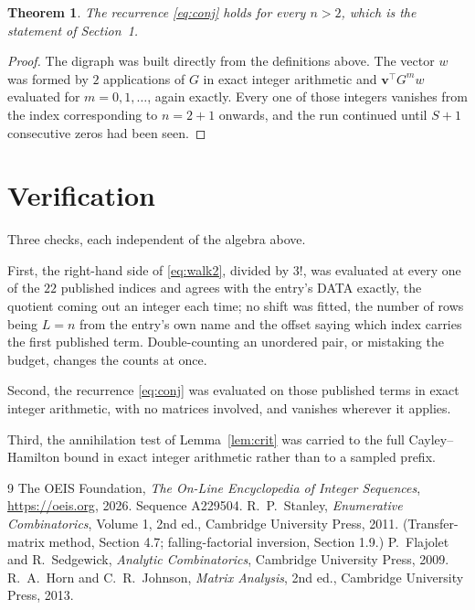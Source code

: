 \documentclass[11pt,a4paper]{article}
\theoremstyle{plain}
\newtheorem{theorem}{Theorem}
\theoremstyle{definition}
\begin{document}
\begin{theorem}
The recurrence \eqref{eq:conj} holds for every $n>2$, which is the statement of
Section~1.
\end{theorem}

\begin{proof}
The digraph was built directly from the definitions above. The vector $w$ was formed by
$2$ applications of $G$ in exact integer arithmetic and $\mathbf{v}^{\!\top}G^{m}w$
evaluated for $m=0,1,\dots$, again exactly. Every one of those integers vanishes from the
index corresponding to $n=2+1$ onwards, and the run continued until $S+1$ consecutive
zeros had been seen.
\end{proof}

\section{Verification}

Three checks, each independent of the algebra above.

First, the right-hand side of \eqref{eq:walk2}, divided by $3!$, was evaluated at every
one of the $22$ published indices and agrees with the entry's DATA exactly, the quotient
coming out an integer each time; no shift was fitted, the number of rows being $L=n$
from the entry's own name and the offset saying which index carries the first published term.
Double-counting an unordered pair, or mistaking the budget, changes the counts at once.

Second, the recurrence \eqref{eq:conj} was evaluated on those published terms in exact
integer arithmetic, with no matrices involved, and vanishes wherever it applies.

Third, the annihilation test of Lemma~\ref{lem:crit} was carried to the full
Cayley--Hamilton bound in exact integer arithmetic rather than to a sampled prefix.

\begin{thebibliography}{9}
 The OEIS Foundation, \emph{The On-Line Encyclopedia of Integer
Sequences}, \url{https://oeis.org}, 2026. Sequence A229504.
 R.~P.~Stanley, \emph{Enumerative Combinatorics}, Volume 1, 2nd ed.,
Cambridge University Press, 2011. (Transfer-matrix method, Section 4.7; falling-factorial
inversion, Section 1.9.)
 P.~Flajolet and R.~Sedgewick, \emph{Analytic Combinatorics}, Cambridge
University Press, 2009.
 R.~A.~Horn and C.~R.~Johnson, \emph{Matrix Analysis}, 2nd ed., Cambridge
University Press, 2013.
\end{thebibliography}
\end{document}
